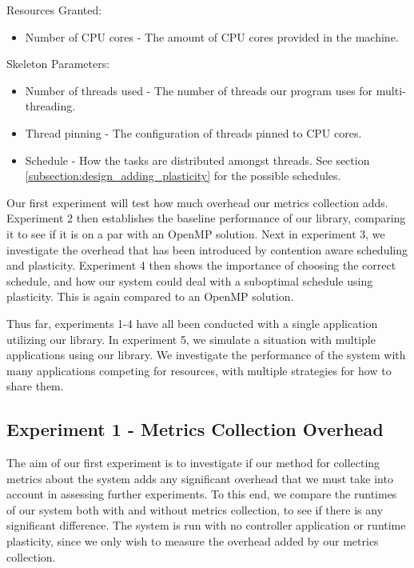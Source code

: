 Resources Granted:

\begin{itemize}
	\item Number of CPU cores - The amount of CPU cores provided in the machine.
\end{itemize}

Skeleton Parameters:

\begin{itemize}
	\item Number of threads used - The number of threads our program uses for multi-threading.
	\item Thread pinning - The configuration of threads pinned to CPU cores.
	\item Schedule - How the tasks are distributed amongst threads. See section \ref{subsection:design_adding_plasticity} for the possible schedules.
\end{itemize}

Our first experiment will test how much overhead our metrics collection adds. Experiment 2 then establishes the baseline performance of our library, comparing it to see if it is on a par with an OpenMP solution. Next in experiment 3, we investigate the overhead that has been introduced by contention aware scheduling and plasticity. Experiment 4 then shows the importance of choosing the correct schedule, and how our system could deal with a suboptimal schedule using plasticity. This is again compared to an OpenMP solution.

Thus far, experiments 1-4 have all been conducted with a single application utilizing our library. In experiment 5, we simulate a situation with multiple applications using our library. We investigate the performance of the system with many applications competing for resources, with multiple strategies for how to share them.



\subsection{Experiment 1 - Metrics Collection Overhead}

The aim of our first experiment is to investigate if our method for collecting metrics about the system adds any significant overhead that we must take into account in assessing further experiments. To this end, we compare the runtimes of our system both with and without metrics collection, to see if there is any significant difference. The system is run with no controller application or runtime plasticity, since we only wish to measure the overhead added by our metrics collection. 

